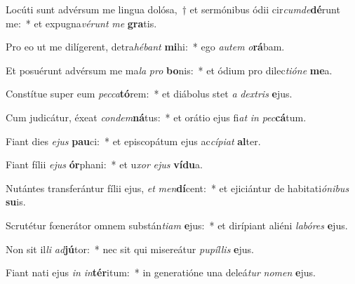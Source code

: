 \item Locúti sunt advérsum me lingua dolósa,~† et sermónibus ódii cir\textit{cum}\textit{de}\textbf{dé}runt me:~* et expugna\textit{vé}\textit{runt} \textit{me} \textbf{gra}tis.
\item Pro eo ut me dilígerent, detra\textit{hé}\textit{bant} \textbf{mi}hi:~* ego \textit{au}\textit{tem} \textit{o}\textbf{rá}bam.
\item Et posuérunt advérsum me ma\textit{la} \textit{pro} \textbf{bo}nis:~* et ódium pro dilec\textit{ti}\textit{ó}\textit{ne} \textbf{me}a.
\item Constítue super eum \textit{pec}\textit{ca}\textbf{tó}rem:~* et diábolus stet \textit{a} \textit{dex}\textit{tris} \textbf{e}jus.
\item Cum judicátur, éxeat \textit{con}\textit{dem}\textbf{ná}tus:~* et orátio ejus fi\textit{at} \textit{in} \textit{pec}\textbf{cá}tum.
\item Fiant dies \textit{e}\textit{jus} \textbf{pau}ci:~* et episcopátum ejus ac\textit{cí}\textit{pi}\textit{at} \textbf{al}ter.
\item Fiant fílii \textit{e}\textit{jus} \textbf{ór}phani:~* et u\textit{xor} \textit{e}\textit{jus} \textbf{ví}\textbf{du}a.
\item Nutántes transferántur fílii ejus, \textit{et} \textit{men}\textbf{dí}cent:~* et ejiciántur de habitati\textit{ó}\textit{ni}\textit{bus} \textbf{su}is.
\item Scrutétur fœnerátor omnem substán\textit{ti}\textit{am} \textbf{e}jus:~* et dirípiant aliéni \textit{la}\textit{bó}\textit{res} \textbf{e}jus.
\item Non sit il\textit{li} \textit{ad}\textbf{jú}tor:~* nec sit qui misereátur \textit{pu}\textit{píl}\textit{lis} \textbf{e}jus.
\item Fiant nati ejus \textit{in} \textit{in}\textbf{tér}itum:~* in generatióne una deleá\textit{tur} \textit{no}\textit{men} \textbf{e}jus.
